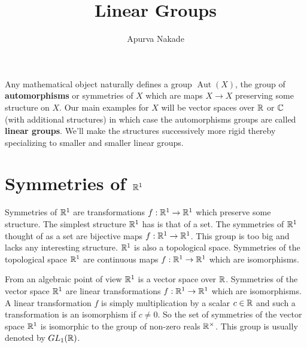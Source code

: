 \iffalse
Noether's theorem says that continuous symmetries of physical systems gives rise to conservation laws. In this class we'll see some examples of low dimensional Lie groups and how they give rise to various phenomenon in physics like time dilation and length contraction in special relativity, spin states of electrons.

Keywords: bilinear forms, signature, SO(2), SO(3), Spin, SO(1,3), Minkowski space and relativity, Noether's theorem, Lie groups.

Prereqs: Linear algebra, Group theory
Homework: Recommended
\fi




\DeclareMathOperator{\aut}{Aut}


\title{Linear Groups}
\author{Apurva Nakade}
\thispagestyle{fancy}
\maketitle



Any mathematical object naturally defines a group $\aut(X)$, the group of \textbf{automorphisms} or symmetries of $X$ which are maps $X \rightarrow X$ preserving {some structure} on $X$. Our main examples for $X$ will be vector spaces over $\mathbb{R}$ or $\mathbb{C}$ (with  additional structures) in which case the automorphisms groups are called \textbf{linear groups}. We'll make the structures successively more rigid thereby specializing to smaller and smaller linear groups.






\section*{Symmetries of $\mathbb{R}^1$}
Symmetries of $\mathbb{R}^1$ are transformations $f: \mathbb{R}^1 \rightarrow \mathbb{R}^1$ which preserve some structure. The simplest structure $\mathbb{R}^1$ has is that of a set. The symmetries of $\mathbb{R}^1$ thought of as a set are bijective maps $f: \mathbb{R}^1 \rightarrow \mathbb{R}^1$. This group is too big and lacks any interesting structure. $\mathbb{R}^1$ is also a topological space. Symmetries of the topological space $\mathbb{R}^1$ are continuous maps $f:\mathbb{R}^1 \rightarrow \mathbb{R}^1$ which are isomorphisms.

From an algebraic point of view $\mathbb{R}^1$ is a vector space over $\mathbb{R}$. Symmetries of the vector space $\mathbb{R}^1$ are linear transformations $f:\mathbb{R}^1 \rightarrow \mathbb{R}^1$ which are isomorphisms. A linear transformation $f$ is simply multiplication by a scalar $c \in \mathbb{R}$ and such a transformation is an isomorphism if $c \neq 0$. So the set of symmetries of the vector space $\mathbb{R}^1$ is isomorphic to the group of non-zero reals $\mathbb{R}^{\times}$. This group is usually denoted by $GL_1(\mathbb{R})$.

